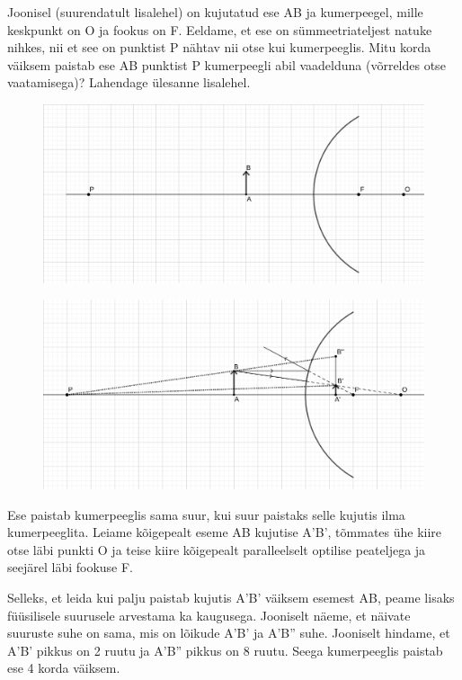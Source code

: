 
Joonisel (suurendatult lisalehel) on kujutatud ese AB ja kumerpeegel, mille keskpunkt on O ja fookus on F. Eeldame, et ese on sümmeetriateljest natuke nihkes, nii et see on punktist P nähtav nii otse kui kumerpeeglis. Mitu korda väiksem paistab ese AB punktist P kumerpeegli abil vaadelduna (võrreldes otse vaatamisega)? Lahendage ülesanne lisalehel.

\begin{figure}[h]
    \centering

    \includegraphics[width=0.75\linewidth]{2023-lahg-02-yl.png}
     \vspace{-20pt}
\end{figure}







\hint

\solu
\begin{figure}[h]
    \centering
    \includegraphics[width=\linewidth]{2023-lahg-02-sol.png}
\end{figure}

Ese paistab kumerpeeglis sama suur, kui suur paistaks selle kujutis ilma kumerpeeglita. Leiame kõigepealt eseme AB kujutise A'B', tõmmates ühe kiire otse läbi punkti O ja teise kiire kõigepealt paralleelselt optilise peateljega ja seejärel läbi fookuse F.

Selleks, et leida kui palju paistab kujutis A'B' väiksem esemest AB, peame lisaks füüsilisele suurusele arvestama ka kaugusega. Jooniselt näeme, et näivate suuruste suhe on sama, mis on lõikude A'B' ja A'B'' suhe. Jooniselt hindame, et A'B' pikkus on 2 ruutu ja A'B'' pikkus on 8 ruutu. Seega kumerpeeglis paistab ese 4 korda väiksem.
\probend